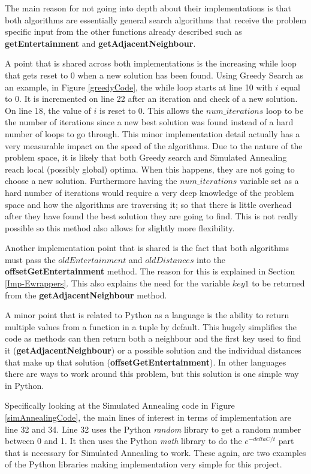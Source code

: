 \documentclass[12pt]{report}
\begin{document}
The main reason for not going into depth about their implementations is that both algorithms are essentially general search algorithms that receive the problem specific input from the other functions already described such as \textbf{getEntertainment} and \textbf{getAdjacentNeighbour}.

A point that is shared across both implementations is the increasing while loop that gets reset to 0 when a new solution has been found. Using Greedy Search as an example, in Figure \ref{greedyCode}, the while loop starts at line 10 with $i$ equal to 0. It is incremented on line 22 after an iteration and check of a new solution. On line 18, the value of $i$ is reset to 0. This allows the $num\_iterations$ loop to be the number of iterations since a new best solution was found instead of a hard number of loops to go through. This minor implementation detail actually has a very measurable impact on the speed of the algorithms. Due to the nature of the problem space, it is likely that both Greedy search and Simulated Annealing reach local (possibly global) optima. When this happens, they are not going to choose a new solution. Furthermore having the $num\_iterations$ variable set as a hard number of iterations would require a very deep knowledge of the problem space and how the algorithms are traversing it; so that there is little overhead after they have found the best solution they are going to find. This is not really possible so this method also allows for slightly more flexibility.

Another implementation point that is shared is the fact that both algorithms must pass the $oldEntertainment$ and $oldDistances$ into the \textbf{offsetGetEntertainment} method. The reason for this is explained in Section \ref{Imp-Ewrappers}. This also explains the need for the variable $key1$ to be returned from the \textbf{getAdjacentNeighbour} method. 

A minor point that is related to Python as a language is the ability to return multiple values from a function in a tuple by default. This hugely simplifies the code as methods can then return both a neighbour and the first key used to find it (\textbf{getAdjacentNeighbour}) or a possible solution and the individual distances that make up that solution (\textbf{offsetGetEntertainment}). In other languages there are ways to work around this problem, but this solution is one simple way in Python.

Specifically looking at the Simulated Annealing code in Figure \ref{simAnnealingCode}, the main lines of interest in terms of implementation are line 32 and 34. Line 32 uses the Python \textit{random}\cite{PythonRandom} library to get a random number between 0 and 1. It then uses the Python \textit{math}\cite{PythonMath} library to do the $e^{-deltaC/t}$ part that is necessary for Simulated Annealing to work. These again, are two examples of the Python libraries making implementation very simple for this project.
\end{document}
